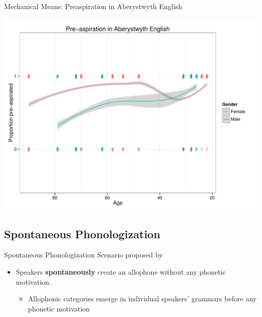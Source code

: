 \documentclass[hyperref={pdfpagelabels=false}]{beamer}
\begin{document}
\begin{frame}{Mechanical Means:  \small{Preaspiration in Aberystwyth English \citep{Hejna2014}}}

\begin{center}
\includegraphics[trim=2cm 2cm 2cm 2cm, clip=false, width=.6\textwidth]{misaplot.pdf}
\end{center}
\end{frame}

\subsection{Spontaneous Phonologization}

\begin{frame}{Spontaneous Phonologization}
	Scenario proposed by \citep{JandaJoseph2003, fruehwald2013} 
	
	\begin{itemize}
		\item Speakers \textbf{spontaneously} create an allophone without any phonetic motivation.  \\
		\begin{itemize}
			\item Allophonic categories emerge in individual speakers' grammars before any phonetic motivation
		\end{itemize}
	\end{itemize}
\end{frame}
\end{document}
